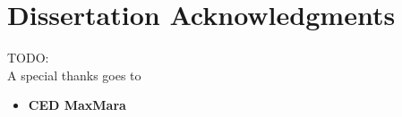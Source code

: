 \section{Dissertation Acknowledgments}
TODO:
\\
A special thanks goes to
\begin{itemize}
    \item \textbf{CED MaxMara}
\end{itemize}

